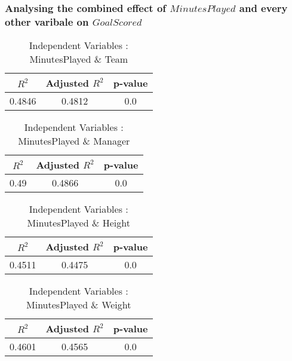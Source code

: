 \documentclass[12pt]{article}
\begin{document}
\subsubsection{Analysing the combined effect of $ MinutesPlayed $ and every other varibale on $ GoalScored $}
\begin{minipage}{0.4\textwidth}
	\begin{table}[H]
		\centering
		\caption{Independent Variables : MinutesPlayed \& Team}\label{table:1a}
		{\begin{tabular}{|c|c|c|}
				\hline
				$ R^2 $ & Adjusted $ R^2 $ & p-value \\
				\hline
				0.4846 & 0.4812 & 0.0 \\
				\hline
			\end{tabular}
		}
	\end{table}
\end{minipage}
\hfill
\begin{minipage}{0.4\textwidth}
	\begin{table}[H]
		\centering
		\caption{Independent Variables : MinutesPlayed \& Manager}\label{table:1a}
		{\begin{tabular}{|c|c|c|}
				\hline
				$ R^2 $ & Adjusted $ R^2 $ & p-value \\
				\hline
				0.49 & 0.4866 & 0.0 \\
				\hline
			\end{tabular}
		}
	\end{table}
\end{minipage}
\hfill
\begin{minipage}{0.4\textwidth}
	\begin{table}[H]
		\centering
		\caption{Independent Variables : MinutesPlayed \& Height}\label{table:1a}
		{\begin{tabular}{|c|c|c|}
				\hline
				$ R^2 $ & Adjusted $ R^2 $ & p-value \\
				\hline
				0.4511 & 0.4475 & 0.0 \\
				\hline
			\end{tabular}
		}
	\end{table}
\end{minipage}
\hfill
\begin{minipage}{0.4\textwidth}
	\begin{table}[H]
		\centering
		\caption{Independent Variables : MinutesPlayed \& Weight}\label{table:1a}
		{\begin{tabular}{|c|c|c|}
				\hline
				$ R^2 $ & Adjusted $ R^2 $ & p-value \\
				\hline
				0.4601 & 0.4565 & 0.0 \\
				\hline
			\end{tabular}
		}
	\end{table}
\end{minipage}
\end{document}

